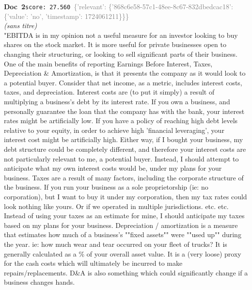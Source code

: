 \documentclass[a4paper,11pt]{article}
\begin{document}
\begin{docenv}
{\footnotesize\textcolor{doccolor}{\textbf{Doc~2}}}\hfill{\tiny\texttt{score:~27.560}}\ {\tiny\textcolor{gray}{\{'relevant': \{'868c6e58-57c1-48ee-8c67-832dbedcac18': \{'value': 'no', 'timestamp': 1724061211\}\}\}}}\\[3pt]
{\small\textit{(sans titre)}}\\[2pt]
\vspace{2pt}
{\footnotesize 
"EBITDA is in my opinion not a useful measure for an investor looking to buy shares on the stock market. It is more useful for private businesses open to changing their structuring, or looking to sell significant parts of their business. One of the main benefits of reporting Earnings Before Interest, Taxes, Depreciation \& Amortization, is that it presents the company as it would look to a potential buyer. Consider that net income, as a metric, includes interest costs, taxes, and depreciation. Interest costs are (to put it simply) a result of multiplying a business's debt by its interest rate. If you own a business, and personally guarantee the loan that the company has with the bank, your interest rates might be artificially low. If you have a policy of reaching high debt levels relative to your equity, in order to achieve high 'financial leveraging', your interest cost might be artificially high. Either way, if I bought your business, my debt structure could be completely different, and therefore your interest costs are not particularly relevant to me, a potential buyer. Instead, I should attempt to anticipate what my own interest costs would be, under my plans for your business. Taxes are a result of many factors, including the corporate structure of the business. If you run your business as a sole proprietorship (ie: no corporation), but I want to buy it under my corporation, then my tax rates could look nothing like yours. Or if we operated in multiple jurisdictions. etc. etc. Instead of using your taxes as an estimate for mine, I should anticipate my taxes based on my plans for your business. Depreciation / amortization is a measure that estimates how much of a business's ""fixed assets"" were ""used up"" during the year. ie: how much wear and tear occurred on your fleet of trucks? It is generally calculated as a \% of your overall asset value. It is a (very loose) proxy for the cash costs which will ultimately be incurred to make repairs/replacements. D\&A is also something which could significantly change if a business changes hands.}
\end{docenv}
\end{document}
